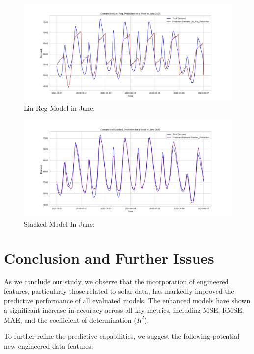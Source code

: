 \documentclass[mstat,12pt]{unswthesis}
\begin{document}
\begin{figure}
\centering
\includegraphics{img/lin-reg-prediction_june_2020.jpg}
\caption{Lin Reg Model in June:}
\end{figure}

\begin{figure}
\centering
\includegraphics{img/stacked-prediction_june_2020.jpg}
\caption{Stacked Model In June:}
\end{figure}

\section{Conclusion and Further
Issues}\label{conclusion-and-further-issues}

As we conclude our study, we observe that the incorporation of
engineered features, particularly those related to solar data, has
markedly improved the predictive performance of all evaluated models.
The enhanced models have shown a significant increase in accuracy across
all key metrics, including MSE, RMSE, MAE, and the coefficient of
determination (\(R^2\)).

To further refine the predictive capabilities, we suggest the following
potential new engineered data features:
\end{document}
